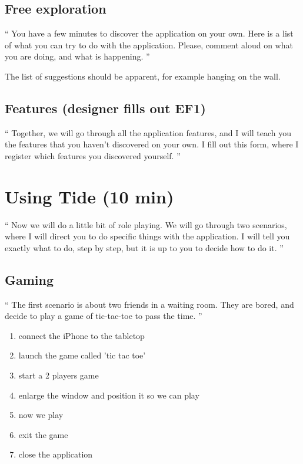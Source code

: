 \subsection{Free exploration}
 
``
You have a few minutes to discover the application on your own.
Here is a list of what you can try to do with the application.
Please, comment aloud on what you are doing, and what is happening.
''

The list of suggestions should be apparent, for example hanging on the wall.


\subsection{Features (designer fills out EF1)}

``
Together, we will go through all the application features, and I will teach you the features that you haven't discovered on your own.
I fill out this form, where I register which features you discovered yourself.
''

\section{Using Tide (10 min)}

``
Now we will do a little bit of role playing. We will go through two scenarios, where I will direct you to do specific things with the application.
I will tell you exactly what to do, step by step, but it is up to you to decide how to do it.
''

\subsection{Gaming}

``
The first scenario is about two friends in a waiting room. They are bored, and decide to play a game of tic-tac-toe to pass the time.
''

\begin{enumerate}
\item connect the iPhone to the tabletop
\item launch the game called 'tic tac toe'
\item start a 2 players game
\item enlarge the window and position it so we can play
\item now we play
\item exit the game
\item close the application
\end{enumerate}

